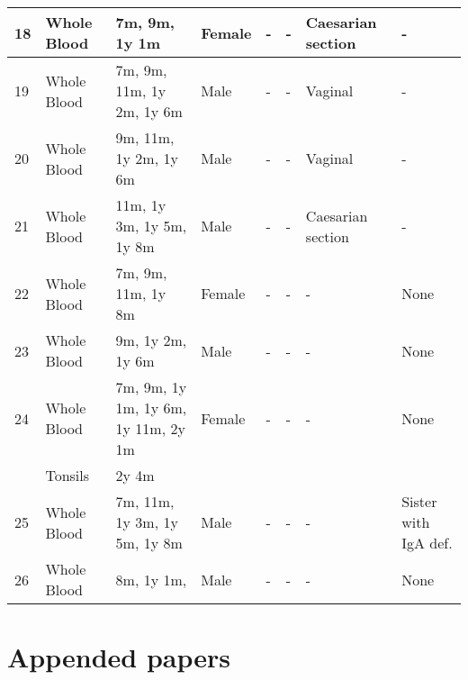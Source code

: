 \documentclass[12pt]{article}
\begin{document}
\begin{landscape}
\begin{longtable}[c]{|l | l |p{4cm}|l|l|l|l|l|}
							18 & Whole Blood & 7m, 9m, 1y 1m                                            & Female & -         & -          & Caesarian section & -                    \\ \hline
							19 & Whole Blood & 7m, 9m, 11m, 1y 2m, 1y 6m                                & Male   & -         & -          & Vaginal           & -                    \\ \hline
							20 & Whole Blood & 9m, 11m, 1y 2m, 1y 6m                                    & Male   & -         & -          & Vaginal           & -                    \\ \hline
							21 & Whole Blood & 11m, 1y 3m, 1y 5m, 1y 8m                                 & Male   & -         & -          & Caesarian section & -                    \\ \hline
							22 & Whole Blood & 7m, 9m, 11m, 1y 8m                                       & Female & -         & -          & -                 & None                 \\ \hline
							23 & Whole Blood & 9m, 1y 2m, 1y 6m                                         & Male   & -         & -          & -                 & None                 \\ \hline
							24 & Whole Blood & 7m, 9m, 1y 1m, 1y 6m, 1y 11m, 2y 1m                      & Female & -         & -          & -                 & None                 \\
							& Tonsils     & 2y 4m                                                    &        &           &            &                   &  \\ \hline
							25 & Whole Blood & 7m, 11m, 1y 3m, 1y 5m, 1y 8m                             & Male   & -         & -          & -                 & Sister with IgA def. \\ \hline
							26 & Whole Blood & 8m, 1y 1m,                                               & Male   & -         & -          & -                 & None
						\end{longtable}
					\end{landscape}	
	
	\section{Appended papers}
		
%		
				
	
	
	
%	
%	
	
	
	
\end{document}
